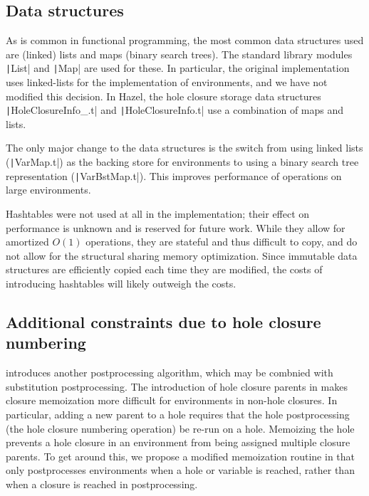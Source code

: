 \subsection{Data structures}
\label{sec:data-structures}

As is common in functional programming, the most common data structures used are (linked) lists and maps (binary search trees). The standard library modules \texttt|List| and \texttt|Map| are used for these. In particular, the original implementation uses linked-lists for the implementation of environments, and we have not modified this decision. In Hazel, the hole closure storage data structures \texttt|HoleClosureInfo_.t| and \texttt|HoleClosureInfo.t| use a combination of maps and lists.

The only major change to the data structures is the switch from using linked lists (\texttt|VarMap.t|) as the backing store for environments to using a binary search tree representation (\texttt|VarBstMap.t|). This improves performance of operations on large environments.

Hashtables were not used at all in the implementation; their effect on performance is unknown and is reserved for future work. While they allow for amortized $O(1)$ operations, they are stateful and thus difficult to copy, and do not allow for the structural sharing memory optimization. Since immutable data structures are efficiently copied each time they are modified, the costs of introducing hashtables will likely outweigh the costs.

\subsection{Additional constraints due to hole closure numbering}
\label{sec:difficulties-hole-numbering}

 introduces another postprocessing algorithm, which may be combnied with substitution postprocessing. The introduction of hole closure parents in  makes closure memoization more difficult for environments in non-hole closures. In particular, adding a new parent to a hole requires that the hole postprocessing (the hole closure numbering operation) be re-run on a hole. Memoizing the hole prevents a hole closure in an environment from being assigned multiple closure parents. To get around this, we propose a modified memoization routine in  that only postprocesses environments when a hole or variable is reached, rather than when a closure is reached in postprocessing.

